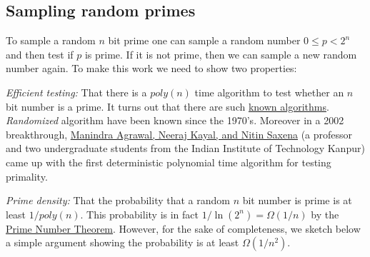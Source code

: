 \hypertarget{DHKErem}{}

\subsection{Sampling random primes}\label{Sampling-random-primes}

To sample a random \(n\) bit prime one can sample a random number
\(0 \leq p < 2^n\) and then test if \(p\) is prime. If it is not prime,
then we can sample a new random number again. To make this work we need
to show two properties:

\emph{Efficient testing:} That there is a \(poly(n)\) time algorithm to
test whether an \(n\) bit number is a prime. It turns out that there are
such \href{https://en.wikipedia.org/wiki/Primality_test}{known
algorithms}. \emph{Randomized} algorithm have been known since the
1970's. Moreover in a 2002 breakthrough,
\href{https://goo.gl/nycWFA}{Manindra Agrawal, Neeraj Kayal, and Nitin
Saxena} (a professor and two undergraduate students from the Indian
Institute of Technology Kanpur) came up with the first deterministic
polynomial time algorithm for testing primality.

\emph{Prime density:} That the probability that a random \(n\) bit
number is prime is at least \(1/poly(n)\). This probability is in fact
\(1/\ln(2^n)=\Omega(1/n)\) by the \href{https://goo.gl/ChrXJY}{Prime
Number Theorem}. However, for the sake of completeness, we sketch below
a simple argument showing the probability is at least \(\Omega(1/n^2)\).

